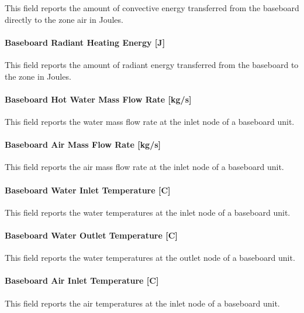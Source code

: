 This field reports the amount of convective energy transferred from the baseboard directly to the zone air in Joules.

\paragraph{Baseboard Radiant Heating Energy {[}J{]}}\label{baseboard-radiant-heating-energy-j-000}

This field reports the amount of radiant energy transferred from the baseboard to the zone in Joules.

\paragraph{Baseboard Hot Water Mass Flow Rate {[}kg/s{]}}\label{baseboard-hot-water-mass-flow-rate-kgs}

This field reports the water mass flow rate at the inlet node of a baseboard unit.

\paragraph{Baseboard Air Mass Flow Rate {[}kg/s{]}}\label{baseboard-air-mass-flow-rate-kgs}

This field reports the air mass flow rate at the inlet node of a baseboard unit.

\paragraph{Baseboard Water Inlet Temperature {[}C{]}}\label{baseboard-water-inlet-temperature-c}

This field reports the water temperatures at the inlet node of a baseboard unit.

\paragraph{Baseboard Water Outlet Temperature {[}C{]}}\label{baseboard-water-outlet-temperature-c}

This field reports the water temperatures at the outlet node of a baseboard unit.

\paragraph{Baseboard Air Inlet Temperature {[}C{]}}\label{baseboard-air-inlet-temperature-c}

This field reports the air temperatures at the inlet node of a baseboard unit.

